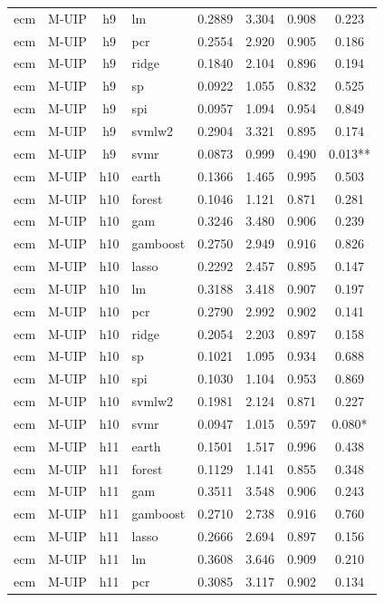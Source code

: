 \begin{ThreePartTable}
\begin{longtable}[t]{llclcccc}
ecm & M-UIP & h9 & lm & 0.2889 & 3.304 & 0.908 & 0.223\\
ecm & M-UIP & h9 & pcr & 0.2554 & 2.920 & 0.905 & 0.186\\
ecm & M-UIP & h9 & ridge & 0.1840 & 2.104 & 0.896 & 0.194\\
ecm & M-UIP & h9 & sp & 0.0922 & 1.055 & 0.832 & 0.525\\
ecm & M-UIP & h9 & spi & 0.0957 & 1.094 & 0.954 & 0.849\\
ecm & M-UIP & h9 & svmlw2 & 0.2904 & 3.321 & 0.895 & 0.174\\
ecm & M-UIP & h9 & svmr & 0.0873 & 0.999 & 0.490 & 0.013**\\
\addlinespace
ecm & M-UIP & h10 & earth & 0.1366 & 1.465 & 0.995 & 0.503\\
ecm & M-UIP & h10 & forest & 0.1046 & 1.121 & 0.871 & 0.281\\
ecm & M-UIP & h10 & gam & 0.3246 & 3.480 & 0.906 & 0.239\\
ecm & M-UIP & h10 & gamboost & 0.2750 & 2.949 & 0.916 & 0.826\\
ecm & M-UIP & h10 & lasso & 0.2292 & 2.457 & 0.895 & 0.147\\
ecm & M-UIP & h10 & lm & 0.3188 & 3.418 & 0.907 & 0.197\\
ecm & M-UIP & h10 & pcr & 0.2790 & 2.992 & 0.902 & 0.141\\
ecm & M-UIP & h10 & ridge & 0.2054 & 2.203 & 0.897 & 0.158\\
ecm & M-UIP & h10 & sp & 0.1021 & 1.095 & 0.934 & 0.688\\
ecm & M-UIP & h10 & spi & 0.1030 & 1.104 & 0.953 & 0.869\\
ecm & M-UIP & h10 & svmlw2 & 0.1981 & 2.124 & 0.871 & 0.227\\
ecm & M-UIP & h10 & svmr & 0.0947 & 1.015 & 0.597 & 0.080*\\
\addlinespace
ecm & M-UIP & h11 & earth & 0.1501 & 1.517 & 0.996 & 0.438\\
ecm & M-UIP & h11 & forest & 0.1129 & 1.141 & 0.855 & 0.348\\
ecm & M-UIP & h11 & gam & 0.3511 & 3.548 & 0.906 & 0.243\\
ecm & M-UIP & h11 & gamboost & 0.2710 & 2.738 & 0.916 & 0.760\\
ecm & M-UIP & h11 & lasso & 0.2666 & 2.694 & 0.897 & 0.156\\
ecm & M-UIP & h11 & lm & 0.3608 & 3.646 & 0.909 & 0.210\\
ecm & M-UIP & h11 & pcr & 0.3085 & 3.117 & 0.902 & 0.134\\

\end{longtable}
\end{ThreePartTable}
